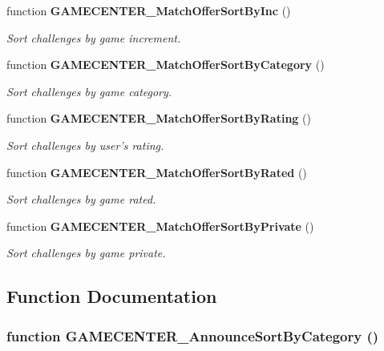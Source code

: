 \begin{CompactItemize}
function {\bf GAMECENTER\_\-MatchOfferSortByInc} ()
\begin{CompactList}\small\item\em Sort challenges by game increment. \item\end{CompactList}\item 
function {\bf GAMECENTER\_\-MatchOfferSortByCategory} ()
\begin{CompactList}\small\item\em Sort challenges by game category. \item\end{CompactList}\item 
function {\bf GAMECENTER\_\-MatchOfferSortByRating} ()
\begin{CompactList}\small\item\em Sort challenges by user's rating. \item\end{CompactList}\item 
function {\bf GAMECENTER\_\-MatchOfferSortByRated} ()
\begin{CompactList}\small\item\em Sort challenges by game rated. \item\end{CompactList}\item 
function {\bf GAMECENTER\_\-MatchOfferSortByPrivate} ()
\begin{CompactList}\small\item\em Sort challenges by game private. \item\end{CompactList}\end{CompactItemize}


\subsection{Function Documentation}
\subsubsection[GAMECENTER\_\-AnnounceSortByCategory]{\setlength{\rightskip}{0pt plus 5cm}function GAMECENTER\_\-AnnounceSortByCategory ()}\label{gamecenter_2gamecenter_8js_ad28304d432ed078fe86680a44b2088b}


